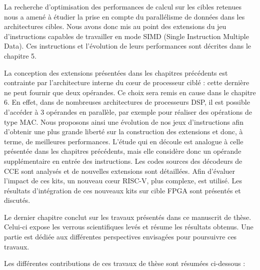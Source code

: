 \documentclass[../main.tex]{subfiles}
\begin{document}
La recherche d'optimisation des performances de calcul sur les cibles retenues nous a amené à étudier la prise en compte du parallélisme de données dans les architectures cibles. 
Nous avons donc mis au point des extensions du jeu d'instructions capables de travailler en mode SIMD (Single Instruction Multiple Data). 
Ces instructions et l'évolution de leurs performances sont décrites dans le chapitre 5.   

La conception des extensions présentées dans les chapitres précédents est contrainte par l’architecture interne du cœur de processeur ciblé : cette dernière ne peut fournir que deux opérandes.
Ce choix sera remis en cause dans le chapitre 6. 
En effet, dans de nombreuses architectures de processeurs DSP, il est possible d’accéder à 3 opérandes en parallèle, par exemple pour réaliser des opérations de type MAC.
Nous proposons ainsi une évolution de nos jeux d'instructions afin d’obtenir une plus grande liberté sur la construction des extensions et donc, à terme, de meilleures performances.
L’étude qui en découle est analogue à celle présentée dans les chapitres précédents, mais elle considère donc un opérande supplémentaire en entrée des instructions.
Les codes sources des décodeurs de CCE sont analysés et de nouvelles extensions sont détaillées. Afin d'évaluer l'impact de ces kits, un nouveau cœur RISC-V, plus complexe, est utilisé. Les résultats d'intégration de ces nouveaux kits sur cible FPGA sont présentés et discutés.

Le dernier chapitre conclut sur les travaux présentés dans ce manuscrit de thèse. Celui-ci expose les verrous scientifiques levés et résume les résultats obtenus. Une partie est dédiée aux différentes perspectives envisagées pour poursuivre ces travaux.

Les différentes contributions de ces travaux de thèse sont résumées ci-dessous :
\end{document}
